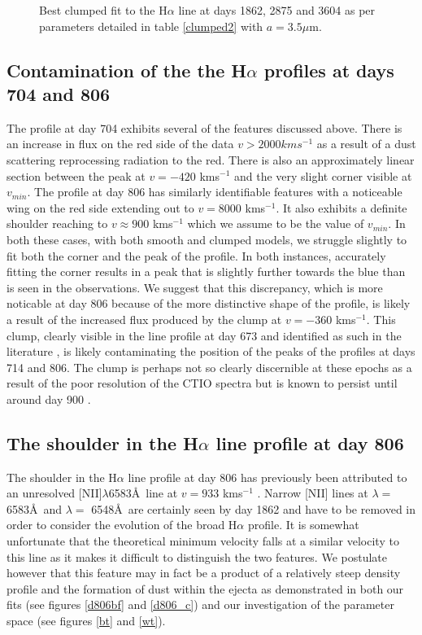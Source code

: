 \documentclass[useAMS,usenatbib,usegraphicx]{mnras}
\begin{document}
\begin{figure}
\begin{center}
\caption{Best clumped fit to the H$\alpha$ line at days 1862, 2875 and 3604 as per parameters detailed in table \ref{clumped2} with $a=3.5\mu$m.}
\label{d1862_3604_cmax}
\end{center}
\end{figure}


\subsection{Contamination of the the H$\alpha$ profiles at days 704 and 806}

The profile at day 704 exhibits several of the features discussed above.  There is an increase in flux on the red side of the data $v>2000kms^{-1}$ as a result of a dust scattering reprocessing radiation to the red.  There is also an approximately linear section between the peak at $v=-420$ kms$^{-1}$ and the very slight corner visible at $v_{min}$.  The profile at day 806 has similarly identifiable features with a noticeable wing on the red side extending out to $v=8000$ kms$^{-1}$.  It also exhibits a definite shoulder reaching to $v \approx 900$ kms$^{-1}$ which we assume to be the value of $v_{min}$.  In both these cases, with both smooth and clumped models, we struggle slightly to fit both the corner and the peak of the profile.  In both instances, accurately fitting the corner  results in a peak that is slightly further towards the blue than is seen in the observations.  We suggest that this discrepancy, which is more noticable at day 806 because of the more distinctive shape of the profile,  is likely a result of the increased flux produced by the clump at  $v=-360$ kms$^{-1}$.  This clump, clearly visible in the line profile at day 673 and identified as such in the literature \citep{Spyromilio1993a,Hanuschik1993}, is likely contaminating the position of the peaks of the profiles at days 714 and 806.  The clump is perhaps not so clearly discernible at these epochs as a result of the poor resolution of the CTIO spectra but is known to persist until around day 900 \citep{Hanuschik1993}.

\subsection{The shoulder in the H$\alpha$ line profile at day 806}

The shoulder in the H$\alpha$ line profile at day 806 has previously been attributed to an unresolved [NII]$\lambda$6583\AA\ line at $v=933$ kms$^{-1}$ \citep{Kozma1998}.  Narrow [NII] lines at $\lambda=$ 6583\AA\ and $\lambda=$ 6548\AA\ are certainly seen by day 1862 and have to be removed in order to consider the evolution of the broad H$\alpha$ profile. It is somewhat unfortunate that the theoretical minimum velocity falls at a similar velocity to this line as it makes it difficult to distinguish the two features.  We postulate however that this feature may in fact be a product of a relatively steep density profile and the formation of dust within the ejecta as demonstrated in both our fits (see figures \ref{d806bf} and \ref{d806_c}) and our investigation of the parameter space (see figures \ref{bt} and \ref{wt}).
\end{document}
